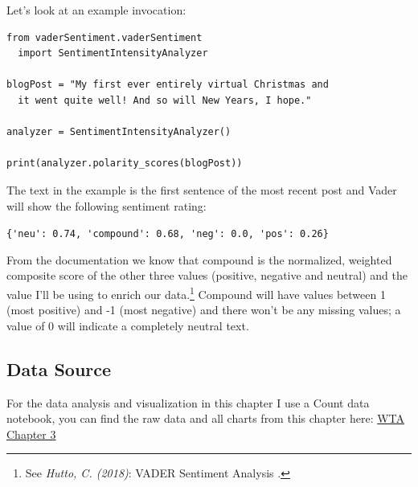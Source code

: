 Let's look at an example invocation:

\begin{lstlisting}[caption=Vader invocation, frame=single, basicstyle=\ttfamily]
from vaderSentiment.vaderSentiment 
  import SentimentIntensityAnalyzer

blogPost = "My first ever entirely virtual Christmas and 
  it went quite well! And so will New Years, I hope."

analyzer = SentimentIntensityAnalyzer()

print(analyzer.polarity_scores(blogPost))
\end{lstlisting}

The text in the example is the first sentence of the most recent post and Vader will show the following sentiment rating:

\verb|{'neu': 0.74, 'compound': 0.68, 'neg': 0.0, 'pos': 0.26}|

From the documentation we know that compound is the normalized, weighted composite score of the other three values (positive, negative and neutral) and the value I'll be using to enrich our data.\footnote{See \textit{Hutto, C. (2018)}: VADER Sentiment Analysis .\cite{vaderReadme}} Compound will have values between 1 (most positive) and -1 (most negative) and there won't be any missing values; a value of 0 will indicate a completely neutral text.

\subsection{Data Source}

For the data analysis and visualization in this chapter I use a Count data notebook, you can find the raw data and all charts from this chapter here: \href{https://count.co/n/6WKuBzDV4Qq}{WTA Chapter 3}
